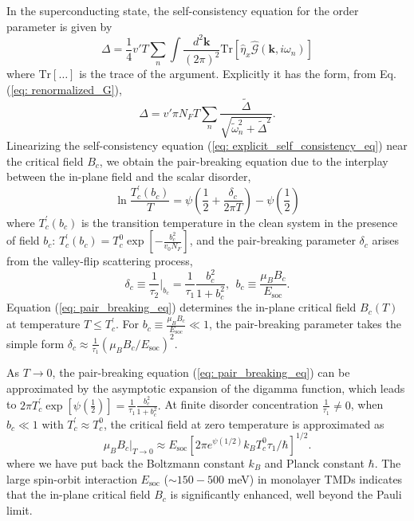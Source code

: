 In the superconducting state, the self-consistency equation for the
order parameter is given by
\begin{equation}
\Delta=\frac{1}{4}v'T\sum_{n}\int\frac{d^{2}\mathbf{k}}{(2\pi)^{2}}\mathrm{Tr}\left[\hat{\eta}_{x}\hat{\mathcal{G}}(\mathbf{k},i\omega_{n})\right]\label{eq: self_consistency_eq}
\end{equation}
where $\mathrm{Tr}\left[\dots\right]$ is the trace of the argument.
Explicitly it has the form, from Eq. (\ref{eq: renormalized_G}),
\begin{equation}
\Delta=v'\pi N_{F}T\sum_{n}\frac{\tilde{\Delta}}{\sqrt{\tilde{\omega}_{n}^{2}+\tilde{\Delta}^{2}}}.\label{eq: explicit_self_consistency_eq}
\end{equation}
Linearizing the self-consistency equation (\ref{eq: explicit_self_consistency_eq})
near the critical field $B_{c}$, we obtain the pair-breaking equation
due to the interplay between the in-plane field and the scalar disorder,
\begin{equation}
\ln\frac{T_{c}^{'}(b_{c})}{T}=\psi\left(\frac{1}{2}+\frac{\delta_{c}}{2\pi T}\right)-\psi\left(\frac{1}{2}\right)\label{eq: pair_breaking_eq}
\end{equation}
where $T_{c}^{'}(b_{c})$ is the transition temperature in the clean
system in the presence of field $b_{c}$: $T_{c}^{'}(b_{c})=T_{c}^{0}\exp\left[-\frac{b_{c}^{2}}{v_{0}N_{F}}\right]$,
and the pair-breaking parameter $\delta_{c}$ arises from the valley-flip
scattering process,
\begin{equation}
\delta_{c}\equiv\frac{1}{\tau_{2}}\biggl|_{b_{c}}=\frac{1}{\tau_{1}}\frac{b_{c}^{2}}{1+b_{c}^{2}},\ \ b_{c}\equiv\frac{\mu_{B}B_{c}}{E_{\text{soc}}}.\label{eq: parameter_pair_breaking}
\end{equation}
Equation (\ref{eq: pair_breaking_eq}) determines the in-plane critical
field $B_{c}(T)$ at temperature $T\leq T_{c}^{'}$.
For $b_{c}\equiv\frac{\mu_{B}B_{c}}{E_{\text{soc}}}\ll1$,
the pair-breaking parameter takes the simple form $\delta_{c}\approx\frac{1}{\tau_{1}}\left(\mu_{B}B_{c}/E_{\text{soc}}\right)^{2}$.

As $T\rightarrow0$, the pair-breaking equation (\ref{eq: pair_breaking_eq})
can be approximated by the asymptotic expansion of the digamma function,
which leads to $2\pi T_{c}^{'}\exp\left[\psi(\frac{1}{2})\right]=\frac{1}{\tau_{1}}\frac{b_{c}^{2}}{1+b_{c}^{2}}.$
At finite disorder concentration $\frac{1}{\tau_{1}}\neq0$, when
$b_{c}\ll1$ with $T_{c}^{'}\approx T_{c}^{0}$, the critical field at zero temperature is approximated as
\begin{equation}
\mu_{B}B_{c}\biggl|_{T\rightarrow0}\approx E_{\text{soc}}\left[2\pi e^{\psi(1/2)}k_{B}T_{c}^{0}\tau_{1}/\hbar\right]^{1/2}.\label{eq: zero_T_Bc}
\end{equation}
where we have put back the Boltzmann constant $k_{B}$ and
Planck constant $\hbar$.
The large spin-orbit interaction $E_{\text{soc}}$
($\sim150-500$ meV) in monolayer TMDs indicates that the in-plane
critical field $B_{c}$ is significantly enhanced, well beyond the
Pauli limit.
